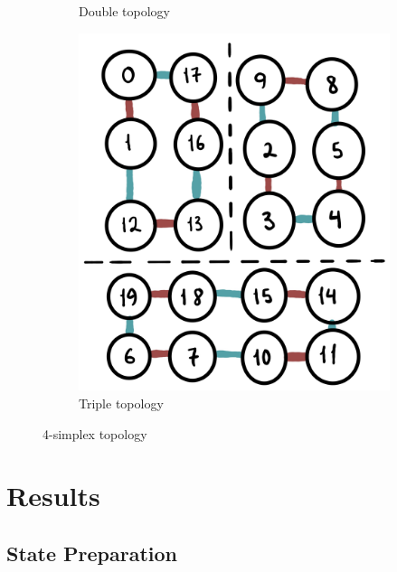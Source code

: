 \documentclass[a4paper,11pt,aps,tightenlines,nofootinbib]{revtex4}
\begin{document}
\begin{figure}[h]
\begin{subfigure}[b]{.2\textwidth}
                \caption{Double topology}
                \end{subfigure}
                \begin{subfigure}[b]{.3\textwidth}
                \includegraphics[scale=.05]{images/simplex-beans.jpg}
                \caption{Triple topology}
                \end{subfigure}
                \caption{4-simplex topology}
        \end{figure}        


\section{Results}
\subsection{State Preparation}
        
\end{document}
